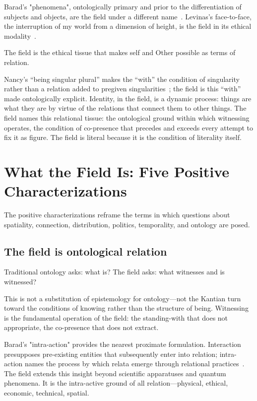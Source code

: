 Barad's "phenomena", ontologically primary and prior to the differentiation of subjects and objects, are the field under a different name~\cite{barad2007}. Levinas's face-to-face, the interruption of my world from a dimension of height, is the field in its ethical modality~\cite{levinas1961}.

The field is the ethical tissue that makes self and Other possible as terms of relation.

Nancy's ``being singular plural'' makes the ``with'' the condition of singularity rather than a relation added to pregiven singularities~\cite{nancy1996}; the field is this ``with'' made ontologically explicit. Identity, in the field, is a dynamic process: things are what they are by virtue of the relations that connect them to other things. The field names this relational tissue: the ontological ground within which witnessing operates, the condition of co-presence that precedes and exceeds every attempt to fix it as figure. The field is literal because it is the condition of literality itself.

\section{What the Field Is: Five Positive Characterizations}

The positive characterizations reframe the terms in which questions about spatiality, connection, distribution, politics, temporality, and ontology are posed.

\subsection{The field is ontological relation}

Traditional ontology asks: what is? The field asks: what witnesses and is witnessed?

This is not a substitution of epistemology for ontology---not the Kantian turn toward the conditions of knowing rather than the structure of being. Witnessing is the fundamental operation of the field: the standing-with that does not appropriate, the co-presence that does not extract.

Barad's "intra-action" provides the nearest proximate formulation. Interaction presupposes pre-existing entities that subsequently enter into relation; intra-action names the process by which relata emerge through relational practices~\cite{barad2007}. The field extends this insight beyond scientific apparatuses and quantum phenomena. It is the intra-active ground of all relation---physical, ethical, economic, technical, spatial.

